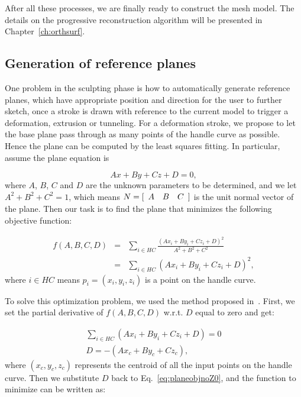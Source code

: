 After all these processes, we are finally ready to construct  the
mesh model. The details on the progressive reconstruction algorithm
will be presented in Chapter~\ref{ch:orthsurf}.


\subsection{Generation of reference planes}
\label{ch3:sec:algo:refplane}

One problem in the sculpting phase is how to automatically generate
reference planes, which have appropriate position and direction for
the user to further sketch, once a stroke is drawn with reference to
the current model to trigger a deformation, extrusion or tunneling.
For a deformation stroke, we propose to let the base plane pass
through as many points of the handle curve as possible. Hence the
plane can be computed by the least squares fitting. In particular,
assume the plane equation is

\begin{equation}
\label{eq:planefunc}
    Ax+By+Cz+D=0,
\end{equation}
where $A$, $B$, $C$ and $D$ are the unknown parameters to be determined,
and we let $A^2+B^2+C^2=1$, which means
$N = [\begin{array}{*{20}c} A & B & C \end{array}]$ is the unit normal
vector of the plane. Then our task is to find the plane that minimizes
the following objective function:

\begin{eqnarray}
\label{eq:planeobjnoZ0}
    f(A,B,C,D) &=& \sum\limits_{i \in HC}
    {\frac {(Ax_i+By_i+Cz_i+D)^2}{A^2+B^2+C^2}}\nonumber\\
    &=& \sum\limits_{i \in HC} {(Ax_i+By_i+Cz_i+D)^2},
\end{eqnarray}
where $i \in HC$  means $p_i=(x_i,y_i,z_i)$ is a point on the handle curve.

To solve this optimization problem, we used the method proposed
in~\cite{SWMB59}. First, we set the partial derivative of
$f(A,B,C,D)$ w.r.t. $D$ equal to zero and get:

\begin{eqnarray}
\label{eq:planeobjPartD}
    \sum\limits_{i \in HC} {(Ax_i+By_i+Cz_i+D)} = 0\nonumber\\
    D = -(Ax_c + By_c + Cz_c),
\end{eqnarray}
where $(x_c, y_c, z_c)$ represents the centroid of all the
input points on the handle curve. Then we substitute $D$ back
to Eq.~\ref{eq:planeobjnoZ0}, and the function to minimize can
be written as:

